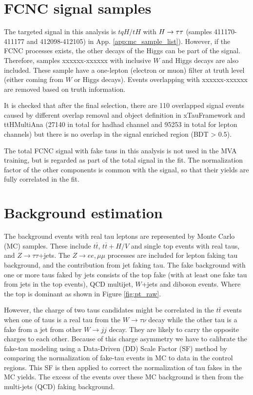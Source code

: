 \section{FCNC signal samples}
\label{sec:fcncbkg}

The targeted signal in this analysis is $tqH/tH$ with $H \rightarrow \tau\tau$ (samples 411170-411177 and 412098-412105) in App. \ref{app:mc_sample_list}).
However, if the FCNC processes exists, the other decays of the Higgs can be part of the signal.
Therefore, samples xxxxxx-xxxxxx with inclusive $W$ and Higgs decays are also included. These sample have a one-lepton (electron or muon) filter at truth level (either coming from $W$ or Higgs decays). Events overlapping with xxxxxx-xxxxxx are removed based on truth information.

It is checked that after the final selection, there are 110 overlapped signal events caused by different overlap removal and object definition in xTauFramework and ttHMultiAna (27140 in total for hadhad channel and 95253 in total for lepton channels) but there is no overlap in the signal enriched region (BDT > 0.5).

The total FCNC signal with fake taus in this analysis is not used in the MVA training, but is regarded as part of the total signal in the fit. The normalization factor of the other components is common with the signal, so that their yields are fully correlated in the fit.

\section{Background estimation}
\label{sec:background}

The background events with real tau leptons are represented by Monte Carlo (MC) samples. These include $t\bar{t}$, $t\bar{t}+H/V$ and 
single top events with real taus, and $Z\to\tau\tau$+jets. The $Z\to ee,\mu\mu$ processes are included for lepton faking 
tau background, and the contribution from jet faking tau.
The fake background with one or more taus faked by jets consists of the top fake (with at least one fake tau from jets in the top events), 
QCD multijet, $W$+jets and diboson events. Where the top is dominant as shown in Figure \ref{fig:pt_raw}.



However, the charge of two taus candidates might be correlated in the $t\bar t$ events
when one of taus is a real tau from the $W\rightarrow \tau \nu$ decay while the other tau is a fake from a jet from other $W\rightarrow jj$ decay.
They are likely to carry the opposite charges to each other.  
Because of this charge asymmetry we have to calibrate the fake-tau modeling using a Data-Driven (DD) Scale Factor (SF) 
method by comparing the normalization of fake-tau events in MC to data in the control regions.
This SF is then applied to correct the normalization of tau fakes in the MC yields.
The excess of the events over these MC background is then from the multi-jets (QCD) faking background.

